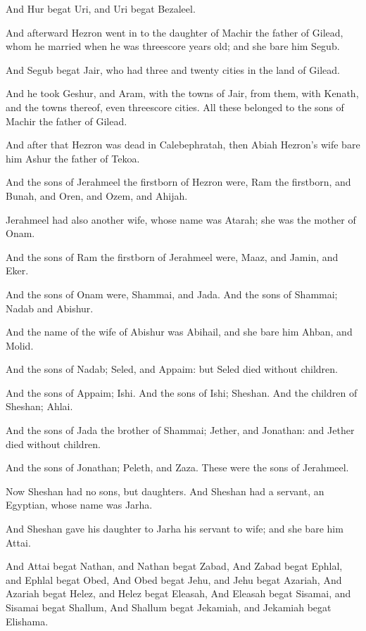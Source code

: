 \Verse And Hur begat Uri, and Uri begat Bezaleel.

\Verse And afterward Hezron went in to the daughter of Machir the father of Gilead, whom he married when he was threescore years old; and she bare him Segub.

\Verse And Segub begat Jair, who had three and twenty cities in the land of Gilead.

\Verse And he took Geshur, and Aram, with the towns of Jair, from them, with Kenath, and the towns thereof, even threescore cities. All these belonged to the sons of Machir the father of Gilead.

\Verse And after that Hezron was dead in Calebephratah, then Abiah Hezron's wife bare him Ashur the father of Tekoa.

\Verse And the sons of Jerahmeel the firstborn of Hezron were, Ram the firstborn, and Bunah, and Oren, and Ozem, and Ahijah.

\Verse Jerahmeel had also another wife, whose name was Atarah; she was the mother of Onam.

\Verse And the sons of Ram the firstborn of Jerahmeel were, Maaz, and Jamin, and Eker.

\Verse And the sons of Onam were, Shammai, and Jada. And the sons of Shammai; Nadab and Abishur.

\Verse And the name of the wife of Abishur was Abihail, and she bare him Ahban, and Molid.

\Verse And the sons of Nadab; Seled, and Appaim: but Seled died without children.

\Verse And the sons of Appaim; Ishi. And the sons of Ishi; Sheshan. And the children of Sheshan; Ahlai.

\Verse And the sons of Jada the brother of Shammai; Jether, and Jonathan: and Jether died without children.

\Verse And the sons of Jonathan; Peleth, and Zaza. These were the sons of Jerahmeel.

\Verse Now Sheshan had no sons, but daughters. And Sheshan had a servant, an Egyptian, whose name was Jarha.

\Verse And Sheshan gave his daughter to Jarha his servant to wife; and she bare him Attai.

\Verse And Attai begat Nathan, and Nathan begat Zabad, \Verse And Zabad begat Ephlal, and Ephlal begat Obed, \Verse And Obed begat Jehu, and Jehu begat Azariah, \Verse And Azariah begat Helez, and Helez begat Eleasah, \Verse And Eleasah begat Sisamai, and Sisamai begat Shallum, \Verse And Shallum begat Jekamiah, and Jekamiah begat Elishama.

